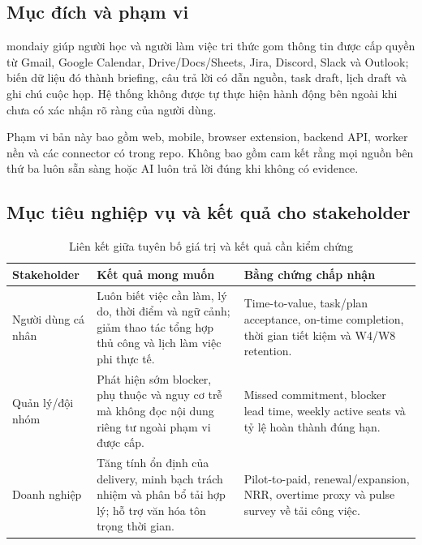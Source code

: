 \documentclass[12pt,a4paper]{article}
\begin{document}
\subsection{Mục đích và phạm vi}
mondaiy giúp người học và người làm việc tri thức gom thông tin được cấp quyền từ Gmail, Google Calendar, Drive/Docs/Sheets, Jira, Discord, Slack và Outlook; biến dữ liệu đó thành briefing, câu trả lời có dẫn nguồn, task draft, lịch draft và ghi chú cuộc họp. Hệ thống không được tự thực hiện hành động bên ngoài khi chưa có xác nhận rõ ràng của người dùng.

Phạm vi bản này bao gồm web, mobile, browser extension, backend API, worker nền và các connector có trong repo. Không bao gồm cam kết rằng mọi nguồn bên thứ ba luôn sẵn sàng hoặc AI luôn trả lời đúng khi không có evidence.

\subsection{Mục tiêu nghiệp vụ và kết quả cho stakeholder}
\begin{table}[H]
\centering
\caption{Liên kết giữa tuyên bố giá trị và kết quả cần kiểm chứng}
\begin{tabularx}{\textwidth}{P{3.0cm}Y P{4.6cm}}
\color{white}\textbf{Stakeholder} & \color{white}\textbf{Kết quả mong muốn} &
\color{white}\textbf{Bằng chứng chấp nhận}\\
\toprule
Người dùng cá nhân & Luôn biết việc cần làm, lý do, thời điểm và ngữ cảnh; giảm
thao tác tổng hợp thủ công và lịch làm việc phi thực tế. & Time-to-value, task/plan
acceptance, on-time completion, thời gian tiết kiệm và W4/W8 retention.\\
Quản lý/đội nhóm & Phát hiện sớm blocker, phụ thuộc và nguy cơ trễ mà không đọc
nội dung riêng tư ngoài phạm vi được cấp. & Missed commitment, blocker lead time,
weekly active seats và tỷ lệ hoàn thành đúng hạn.\\
Doanh nghiệp & Tăng tính ổn định của delivery, minh bạch trách nhiệm và phân bổ
tải hợp lý; hỗ trợ văn hóa tôn trọng thời gian. & Pilot-to-paid, renewal/expansion,
NRR, overtime proxy và pulse survey về tải công việc.\\
\bottomrule
\end{tabularx}
\end{table}
\end{document}
